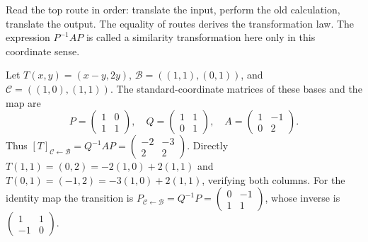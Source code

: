 \begin{center}
\end{center}
Read the top route in order: translate the input, perform the old
calculation, translate the output. The equality of routes derives the
transformation law. The expression $P^{-1}AP$ is called a similarity
transformation here only in this coordinate sense.
\begin{example}
Let $T(x,y)=(x-y,2y)$,
$\mathcal B=((1,1),(0,1))$, and $\mathcal C=((1,0),(1,1))$.
The standard-coordinate matrices of these bases and the map are
\[
P=\begin{pmatrix}1&0\\1&1\end{pmatrix},\quad
Q=\begin{pmatrix}1&1\\0&1\end{pmatrix},\quad
A=\begin{pmatrix}1&-1\\0&2\end{pmatrix}.
\]
Thus $[T]_{\mathcal C\leftarrow\mathcal B}=Q^{-1}AP
=\left(\begin{matrix}-2&-3\\2&2\end{matrix}\right)$.
Directly $T(1,1)=(0,2)=-2(1,0)+2(1,1)$ and
$T(0,1)=(-1,2)=-3(1,0)+2(1,1)$, verifying both columns.
For the identity map the transition is
$P_{\mathcal C\leftarrow\mathcal B}=Q^{-1}P
=\left(\begin{matrix}0&-1\\1&1\end{matrix}\right)$,
whose inverse is $\left(\begin{matrix}1&1\\-1&0\end{matrix}\right)$.
\end{example}
